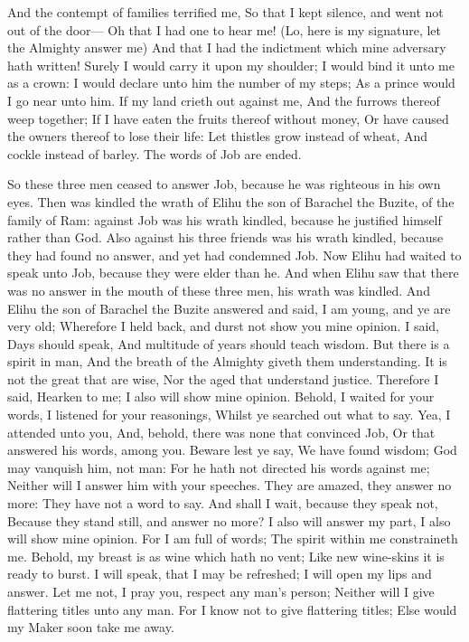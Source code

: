 And the contempt of families terrified me, So that I kept silence, and went not out of the door—  Oh that I had one to hear me! (Lo, here is my signature, let the Almighty answer me) And that I had the indictment which mine adversary hath written!  Surely I would carry it upon my shoulder; I would bind it unto me as a crown:  I would declare unto him the number of my steps; As a prince would I go near unto him.  If my land crieth out against me, And the furrows thereof weep together;  If I have eaten the fruits thereof without money, Or have caused the owners thereof to lose their life:  Let thistles grow instead of wheat, And cockle instead of barley. The words of Job are ended. 

So these three men ceased to answer Job, because he was righteous in his own eyes. Then was kindled the wrath of Elihu the son of Barachel the Buzite, of the family of Ram: against Job was his wrath kindled, because he justified himself rather than God. Also against his three friends was his wrath kindled, because they had found no answer, and yet had condemned Job. Now Elihu had waited to speak unto Job, because they were elder than he. And when Elihu saw that there was no answer in the mouth of these three men, his wrath was kindled.  And Elihu the son of Barachel the Buzite answered and said, I am young, and ye are very old; Wherefore I held back, and durst not show you mine opinion.  I said, Days should speak, And multitude of years should teach wisdom.  But there is a spirit in man, And the breath of the Almighty giveth them understanding.  It is not the great that are wise, Nor the aged that understand justice.  Therefore I said, Hearken to me; I also will show mine opinion.  Behold, I waited for your words, I listened for your reasonings, Whilst ye searched out what to say.  Yea, I attended unto you, And, behold, there was none that convinced Job, Or that answered his words, among you.  Beware lest ye say, We have found wisdom; God may vanquish him, not man:  For he hath not directed his words against me; Neither will I answer him with your speeches.  They are amazed, they answer no more: They have not a word to say.  And shall I wait, because they speak not, Because they stand still, and answer no more?  I also will answer my part, I also will show mine opinion.  For I am full of words; The spirit within me constraineth me.  Behold, my breast is as wine which hath no vent; Like new wine-skins it is ready to burst.  I will speak, that I may be refreshed; I will open my lips and answer.  Let me not, I pray you, respect any man’s person; Neither will I give flattering titles unto any man.  For I know not to give flattering titles; Else would my Maker soon take me away. 

